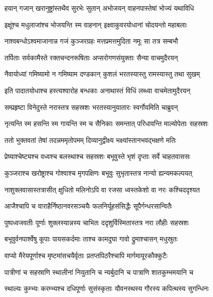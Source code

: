 \twolineshloka
{हयान् गजान् खरानुष्ट्रांस्तथैव सुरभेः सुतान्}
{अभोजयन् वाहनपास्तेषां भोज्यं यथाविधि} %

\twolineshloka
{इक्षूंश्च मधुलाजांश्च भोजयन्ति स्म वाहनान्}
{इक्ष्वाकुवरयोधानां चोदयन्तो महाबलाः} %

\twolineshloka
{नाश्वबन्धोऽश्वमाजानान्न गजं कुञ्जरग्रहः}
{मत्तप्रमत्तमुदिता नमूः सा तत्र सम्बभौ} %

\twolineshloka
{तर्पिताः सर्वकामैस्ते रक्तचन्दनरूषिताः}
{अप्सरोगणसंयुक्ताः सैन्या वाचमुदैरयन्} %

\twolineshloka
{नैवायोध्यां गमिष्यामो न गमिष्याम दण्डकान्}
{कुशलं भरतस्यास्तु रामस्यास्तु तथा सुखम्} %

\twolineshloka
{इति पादातयोधाश्च हस्त्यश्वारोह बन्धकाः}
{अनाथास्तं विधिं लब्ध्वा वाचमेतामुदैरयन्} %

\twolineshloka
{सम्प्रहृष्टा विनेदुस्ते नरास्तत्र सहस्रशः}
{भरतस्यानुयातारः स्वर्गोयमिति चाब्रुवन्} %

\twolineshloka
{नृत्यन्ति स्म हसन्ति स्म गायन्ति स्म च सैनिकाः}
{समन्तात् परिधावन्ति माल्योपेताः सहस्रशः} %

\twolineshloka
{ततो भुक्तवतां तेषां तदन्नममृतोपमम्}
{दिव्यानुद्वीक्ष्य भक्ष्यांस्तानभवद्भक्षणे मतिः} %

\twolineshloka
{प्रेष्याश्चेष्ट्यश्च वध्वश्च बलस्थाश्च सहस्रशः}
{बभूवुस्ते भृशं दृप्ताः सर्वे चाहतवाससः} %

\twolineshloka
{कुञ्जराश्च खरोष्ट्राश्च गोश्वाश्च मृगपक्षिणः}
{बभूवुः सुभृतास्तत्र नान्यो ह्यन्यमकल्पयत्} %

\twolineshloka
{नाशुक्लवासास्तत्रासीत् क्षुधितो मलिनोऽपि वा}
{रजसा ध्वस्तकेशो वा नरः कश्चिददृश्यत} %

\twolineshloka
{आजैश्चापि च वाराहैर्निष्ठानवरसञ्चयैः}
{फलनिर्यूहसंसिद्धैः सूपैर्गन्धरसान्वितैः} %

\twolineshloka
{पुष्पध्वजवतीः पूर्णाः शुक्लस्यान्नस्य चाभितः}
{ददृशुर्विस्मितास्तत्र नरा लौहीः सहस्रशः} %

\twolineshloka
{बभूवुर्वनपार्श्वेषु कूपाः पायसकर्दमाः}
{ताश्च कामदुघा गावो द्रुमाश्चासन् मधुस्रुतः} %

\twolineshloka
{वाप्यो मैरेयपूर्णाश्च मृष्टमांसचयैर्वृताः}
{प्रतप्तपिठरैश्चापि मार्गमायूरकौक्कुटैः} %

\twolineshloka
{पात्रीणां च सहस्राणि स्थालीनां नियुतानि च}
{न्यर्बुदानि च पात्राणि शातकुम्भमयानि च} %

\twolineshloka
{स्थाल्यः कुम्भ्यः करम्भ्यश्च दधिपूर्णाः सुसंस्कृताः}
{यौवनस्थस्य गौरस्य कपित्थस्य सुगन्धिनः} %

